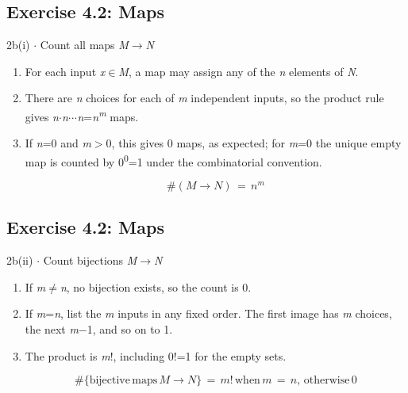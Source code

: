 \documentclass[11pt]{article}
\begin{document}
\begin{keepsection}\subsection{Exercise 4.2: Maps}

\begin{workedbox}{2b(i) \ensuremath{\cdot} Count all maps \textit{M}\ensuremath{\to}\textit{N}}
\begin{enumerate}
\item For each input \textit{x}\ensuremath{\in}\textit{M}, a map may assign any of the \textit{n} elements of \textit{N}.
\item There are \textit{n} choices for each of \textit{m} independent inputs, so the product rule gives \textit{n}\ensuremath{\cdot}\textit{n}\ensuremath{\cdot}\ensuremath{\cdot}\ensuremath{\cdot}\textit{n}=\textit{n}\textsuperscript{\textit{m}} maps.
\item {}
If \textit{n}=0 and \textit{m}\ensuremath{>}0, this gives 0 maps, as expected; for \textit{m}=0 the unique empty map is counted by 0\textsuperscript{0}=1 under the combinatorial convention.

\begin{equation*}\#({M}\to {N})\, =\, {n}^{{m}}\end{equation*}
\end{enumerate}
\end{workedbox}

\end{keepsection}
\begin{keepsection}\subsection{Exercise 4.2: Maps}

\begin{workedbox}{2b(ii) \ensuremath{\cdot} Count bijections \textit{M}\ensuremath{\to}\textit{N}}
\begin{enumerate}
\item If \textit{m}\ensuremath{\neq}\textit{n}, no bijection exists, so the count is 0.
\item If \textit{m}=\textit{n}, list the \textit{m} inputs in any fixed order. The first image has \textit{m} choices, the next \textit{m}\ensuremath{-}1, and so on to 1.
\item {}
The product is \textit{m}!, including 0!=1 for the empty sets.

\begin{equation*}\#\{\text{bijective}\, \text{maps}\, {M}\to {N}\}\, =\, {m}!\, \text{when}\, {m}\, =\, {n},\, \text{otherwise}\, 0\end{equation*}
\end{enumerate}
\end{workedbox}

\end{keepsection}
\end{document}
